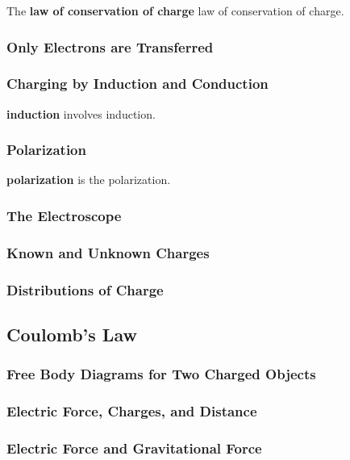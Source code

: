 \documentclass[dvipsnames]{article}
\begin{document}
The \textbf{\gls{law of conservation of charge}} \glsdesc{law of conservation of charge}.

\subsubsection{Only Electrons are Transferred}

\subsubsection{Charging by Induction and Conduction}

\textbf{\Gls{induction}} involves \glsdesc{induction}.

\subsubsection{Polarization}

\textbf{\Gls{polarization}} is the \glsdesc{polarization}.

\subsubsection{The Electroscope}

\subsubsection{Known and Unknown Charges}

\subsubsection{Distributions of Charge}

\subsection{Coulomb's Law}

\subsubsection{Free Body Diagrams for Two Charged Objects}

\subsubsection{Electric Force, Charges, and Distance}

\subsubsection{Electric Force and Gravitational Force}
\end{document}
